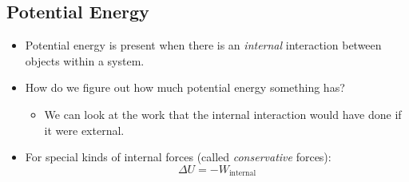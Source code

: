 \documentclass[]{article}
\begin{document}
\newpage
\begin{TeacherMargin}

\end{TeacherMargin}
\begin{PresentSpace}
\vspace{-10pt}
\section*{Potential Energy}
\vspace{-10pt}
\begin{itemize}
	\item Potential energy is present when there is an \textit{internal} interaction between objects within a system.
	\item How do we figure out how much potential energy something has?
	\begin{itemize}
		\item We can look at the work that the internal interaction would have done if it were external.
	\end{itemize}
	\item For special kinds of internal forces (called \textit{conservative} forces):
	\[
	\Delta U = -W_{\text{internal}}
	\]
\end{itemize}
\end{PresentSpace}
\newpage
\begin{TeacherMargin}
\begin{center}
\end{center}
\end{TeacherMargin}
\end{document}
